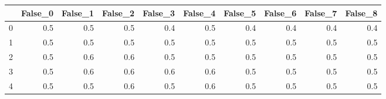 \begin{tabular}{lrrrrrrrrr}
\toprule
{} &  False\_0 &  False\_1 &  False\_2 &  False\_3 &  False\_4 &  False\_5 &  False\_6 &  False\_7 &  False\_8 \\ \hline
\midrule
0 &      0.5 &      0.5 &      0.5 &      0.4 &      0.5 &      0.4 &      0.4 &      0.4 &      0.4 \\ \hline
1 &      0.5 &      0.5 &      0.5 &      0.5 &      0.5 &      0.5 &      0.5 &      0.5 &      0.5 \\ \hline
2 &      0.5 &      0.6 &      0.6 &      0.5 &      0.5 &      0.5 &      0.5 &      0.5 &      0.5 \\ \hline
3 &      0.5 &      0.6 &      0.6 &      0.6 &      0.6 &      0.5 &      0.5 &      0.5 &      0.5 \\ \hline
4 &      0.5 &      0.5 &      0.6 &      0.5 &      0.6 &      0.5 &      0.5 &      0.5 &      0.5 \\ \hline
\bottomrule
\end{tabular}
